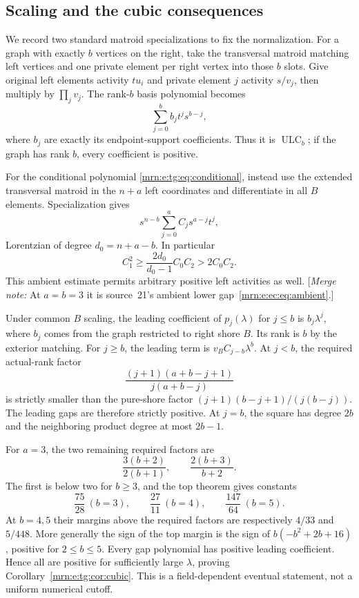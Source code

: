\documentclass[11pt,a4paper]{article}
\theoremstyle{remark}\newtheorem{remark}[theorem]{Remark}
\newcommand{\ULC}{\operatorname{ULC}}      %
\newcommand{\mnote}[1]{[\textit{Merge note:} #1]}
\begin{document}
\subsection{Scaling and the cubic consequences}
We record two standard matroid specializations to fix the normalization. For a graph with exactly $b$ vertices on the right, take the transversal matroid matching left vertices and one private element per right vertex into those $b$ slots. Give original left elements activity $tu_i$ and private element $j$ activity $s/v_j$, then multiply by $\prod_jv_j$. The rank-$b$ basis polynomial becomes
\[
 \sum_{j=0}^b b_jt^js^{b-j},
\]
where $b_j$ are exactly its endpoint-support coefficients. Thus it is $\ULC_b$; if the graph has rank $b$, every coefficient is positive.

For the conditional polynomial \eqref{mrn:e:tg:eq:conditional}, instead use the extended transversal matroid in the $n+a$ left coordinates and differentiate in all $B$ elements. Specialization gives
\begin{equation}\label{mrn:e:tg:eq:ambient}
 s^{n-b}\sum_{j=0}^a C_js^{a-j}t^j,
\end{equation}
Lorentzian of degree $d_0=n+a-b$. In particular
\begin{equation}\label{mrn:e:tg:eq:first}
 C_1^2\ge\frac{2d_0}{d_0-1}C_0C_2>2C_0C_2.
\end{equation}
This ambient estimate permits arbitrary positive left activities as well. \mnote{At $a=b=3$ it is source~21's ambient lower gap~\eqref{mrn:e:ec:eq:ambient}.}

Under common $B$ scaling, the leading coefficient of $p_j(\lambda)$ for $j\le b$ is $b_j\lambda^j$, where $b_j$ comes from the graph restricted to right shore $B$. Its rank is $b$ by the exterior matching. For $j\ge b$, the leading term is $v_BC_{j-b}\lambda^b$. At $j<b$, the required actual-rank factor
\[
 \frac{(j+1)(a+b-j+1)}{j(a+b-j)}
\]
is strictly smaller than the pure-shore factor $(j+1)(b-j+1)/(j(b-j))$. The leading gaps are therefore strictly positive. At $j=b$, the square has degree $2b$ and the neighboring product degree at most $2b-1$.

For $a=3$, the two remaining required factors are
\[
 \frac{3(b+2)}{2(b+1)},\qquad \frac{2(b+3)}{b+2}.
\]
The first is below two for $b\ge3$, and the top theorem gives constants
\[
 \frac{75}{28}\ (b=3),\qquad \frac{27}{11}\ (b=4),
 \qquad \frac{147}{64}\ (b=5).
\]
At $b=4,5$ their margins above the required factors are respectively $4/33$ and $5/448$. More generally the sign of the top margin is the sign of $b(-b^2+2b+16)$, positive for $2\le b\le5$.
Every gap polynomial has positive leading coefficient. Hence all are positive for sufficiently large $\lambda$, proving Corollary~\ref{mrn:e:tg:cor:cubic}. This is a field-dependent eventual statement, not a uniform numerical cutoff.
\end{document}
